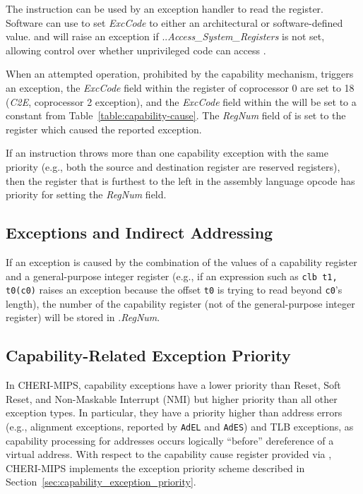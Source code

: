 The  instruction can be used by an exception handler to
read the \capcausereg{} register.
Software can use  to set \emph{ExcCode} to either an
architectural or software-defined value.
 and  will raise an exception
if \PCC{}.\cperms{}.\emph{Access\_System\_Registers} is not set, allowing
control over whether unprivileged code can access \capcausereg{}.

When an attempted operation, prohibited by the capability mechanism, triggers
an exception, the \textit{ExcCode} field within the \causereg{}
register of coprocessor 0 are set to 18 (\textit{C2E}, coprocessor 2
exception), and the \textit{ExcCode} field within the \capcausereg{} will be set to a constant from
Table~\ref{table:capability-cause}.
The \emph{RegNum} field of \capcausereg{} is set to the register which caused
the reported exception.

If an instruction throws more than one capability exception with the
same priority (e.g., both the source and destination register are
reserved registers), then the register that is furthest to the left in
the assembly language opcode has priority for setting the \emph{RegNum} field.

\subsection{Exceptions and Indirect Addressing}

If an exception is caused by the combination of the values of a capability
register and a general-purpose integer register (e.g., if an expression such as
\texttt{clb t1, t0(c0)} raises an exception because the offset \texttt{t0} is
trying to read beyond \texttt{c0}'s length), the number of the capability register
(not of the general-purpose integer register) will be stored in \capcausereg{}.\emph{RegNum}.

\subsection{Capability-Related Exception Priority}

In CHERI-MIPS, capability exceptions have a lower priority than Reset, Soft
Reset, and Non-Maskable Interrupt (NMI) but higher priority than all other
exception types.
In particular, they have a priority higher than address errors (e.g.,
alignment exceptions, reported by \texttt{AdEL} and \texttt{AdES}) and TLB
exceptions, as capability processing for addresses occurs logically ``before''
dereference of a virtual address.
With respect to the capability cause register provided via \capcausereg{},
CHERI-MIPS implements the exception priority scheme described in
Section~\ref{sec:capability_exception_priority}.

